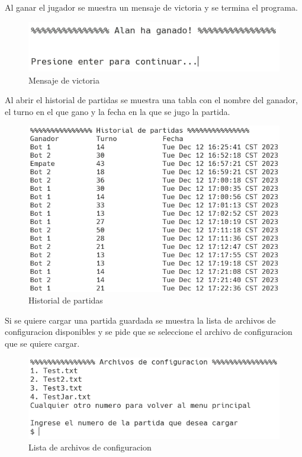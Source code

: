 \documentclass[12pt]{article}
\begin{document}
  Al ganar el jugador se muestra un mensaje de victoria y se termina el programa.

  \begin{figure}[h!]
    \centering
    \includegraphics[]{pf7.png}
    \caption{Mensaje de victoria}
  \end{figure}

  Al abrir el historial de partidas se muestra una tabla con el nombre del ganador, el turno en el que gano y la fecha en la que se jugo la partida.

  \begin{figure}[h!]
    \centering
    \includegraphics[]{pf8.png}
    \caption{Historial de partidas}
  \end{figure}

  Si se quiere cargar una partida guardada se muestra la lista de archivos de configuracion disponibles y se pide que se seleccione el archivo de configuracion que se quiere cargar.

  \begin{figure}[h!]
    \centering
    \includegraphics[]{pf9.png}
    \caption{Lista de archivos de configuracion}
  \end{figure}
\end{document}

